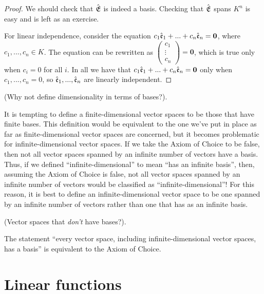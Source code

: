 \begin{proof}
   We should check that ${\hat{\mathfrak{E}}}$ is indeed a basis. Checking that ${\hat{\mathfrak{E}}}$ spans $K^n$ is easy and is left as an exercise.
   
   For linear independence, consider the equation $c_1 \hat{\mathfrak{e}}_1 + ... + c_n \hat{\mathfrak{e}}_n = \mathbf{0}$, where $c_1, ..., c_n \in K$. The equation can be rewritten as $\begin{pmatrix} c_1 \\ \vdots \\ c_n \end{pmatrix} = \mathbf{0}$, which is true only when $c_i = 0$ for all $i$. In all we have that $c_1 \hat{\mathfrak{e}}_1 + ... + c_n \hat{\mathfrak{e}}_n = \mathbf{0}$ only when $c_1, ..., c_n = 0$, so $\hat{\mathfrak{e}}_1, ..., \hat{\mathfrak{e}}_n$ are linearly independent.
\end{proof}

\begin{remark}
    (Why not define dimensionality in terms of bases?). 
    
    It is tempting to define a finite-dimensional vector spaces to be those that have finite bases. This definition would be equivalent to the one we've put in place as far as finite-dimensional vector spaces are concerned, but it becomes problematic for infinite-dimensional vector spaces. If we take the Axiom of Choice to be false, then not all vector spaces spanned by an infinite number of vectors have a basis. Thus, if we defined ``infinite-dimensional'' to mean ``has an infinite basis'', then, assuming the Axiom of Choice is false, not all vector spaces spanned by an infinite number of vectors would be classified as ``infinite-dimensional''! For this reason, it is best to define an infinite-dimensional vector space to be one spanned by an infinite number of vectors rather than one that has as an infinite basis.
\end{remark}

\begin{remark}
    (Vector spaces that \textit{don't} have bases?).
    
    The statement ``every vector space, including infinite-dimensional vector spaces, has a basis'' is equivalent to the Axiom of Choice.
\end{remark}

\newpage

\section{Linear functions}

